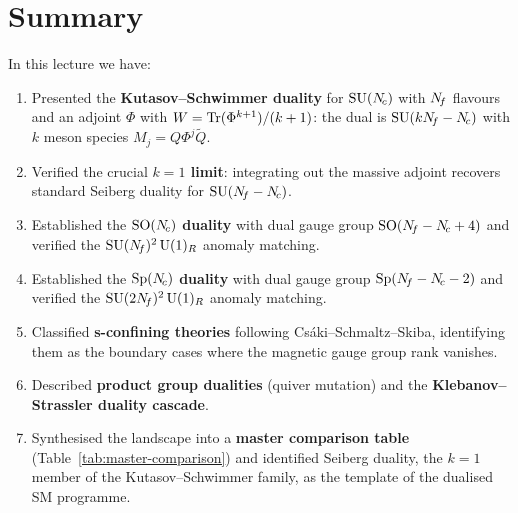 \documentclass[11pt,a4paper]{article}
\newcommand{\SO}[1]{\mathrm{SO}(#1)}
\newcommand{\Sp}[1]{\mathrm{Sp}(#1)}
\begin{document}
\section{Summary}
\label{sec:summary-L9}

In this lecture we have:
\begin{enumerate}
  \item Presented the \textbf{Kutasov--Schwimmer duality} for
    $\mathrm{SU}(N_{\!c})$ with $N_{\!f}$ flavours and an adjoint $\Phi$ with
    $W = \mathrm{Tr}(\Phi^{k+1})/(k+1)$: the dual is $\mathrm{SU}(kN_{\!f} - N_{\!c})$
    with $k$ meson species $M_j = Q\Phi^j\widetilde{Q}$.
  \item Verified the crucial \textbf{$k=1$ limit}: integrating out
    the massive adjoint recovers standard Seiberg duality for
    $\mathrm{SU}(N_{\!f} - N_{\!c})$.
  \item Established the \textbf{$\SO{\Nc}$ duality} with dual gauge
    group $\SO{\Nf - \Nc + 4}$ and verified the
    $\mathrm{SU}(N_{\!f})^2\,\mathrm{U}(1)_R$ anomaly matching.
  \item Established the \textbf{$\Sp{\Nc}$ duality} with dual gauge
    group $\Sp{\Nf - \Nc - 2}$ and verified the
    $\mathrm{SU}(2N_{\!f})^2\,\mathrm{U}(1)_R$ anomaly matching.
  \item Classified \textbf{s-confining theories} following
    Cs\'aki--Schmaltz--Skiba, identifying them as the boundary
    cases where the magnetic gauge group rank vanishes.
  \item Described \textbf{product group dualities} (quiver mutation)
    and the \textbf{Klebanov--Strassler duality cascade}.
  \item Synthesised the landscape into a
    \textbf{master comparison table} (Table~\ref{tab:master-comparison})
    and identified Seiberg duality, the $k = 1$ member of the
    Kutasov--Schwimmer family, as the template of the dualised SM
    programme.
\end{enumerate}
\end{document}
